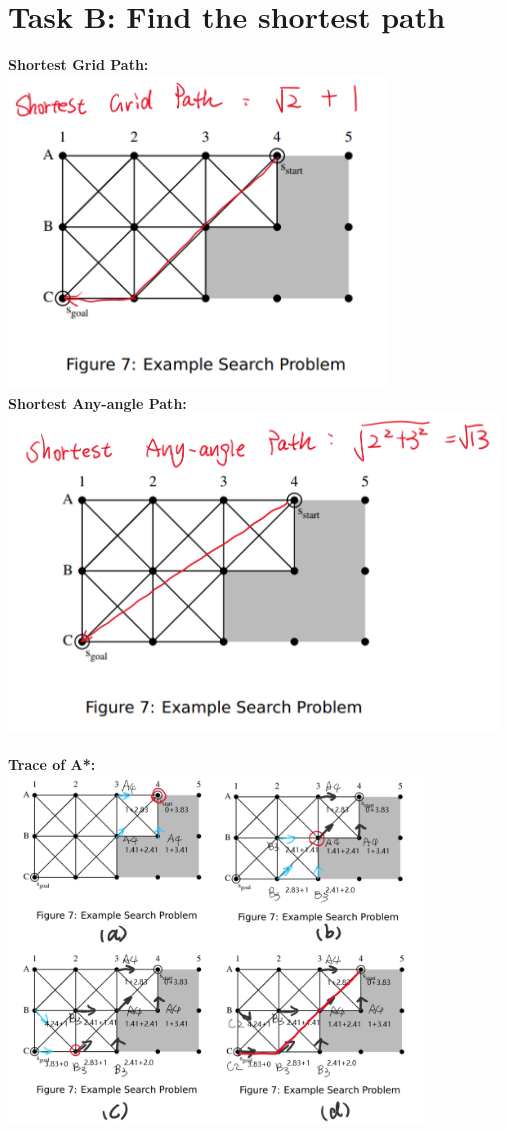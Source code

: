 \documentclass[12pt, letterpaper]{article}
\begin{document}
\section{Task B: Find the shortest path}
\textbf{Shortest Grid Path:}\\
\includegraphics[width=10cm]{1b-grid}\\
\textbf{Shortest Any-angle Path:}\\
\includegraphics[width=13cm]{1b-anyangle}\\
\\
\textbf{Trace of A*:}\\
\includegraphics[width=11cm]{1b-A}\\
\end{document}
